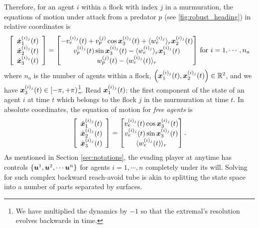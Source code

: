 Therefore, for an agent $i$ within a flock with index $j$ in a murmuration, the equations of motion under attack from a predator $p$ (see \autoref{fig:robust_heading}) in relative coordinates is %
%
\begin{align}
\left[\begin{array}{c}
\dot{\state}_1^{(i)_j}(t) \\ \dot{\state}_2^{(i)_j} (t) \\ \dot{\state}_3^{(i)_j} (t)
\end{array}\right] = \begin{bmatrix}
-v_e^{(i)_j}(t) + v_p^{(j)} \cos \state_3^{(i)_j}(t) + \langle w_e^{(i)_j} \rangle_r \state_2^{(i)_j}(t)
%
\\
v_p^{(i)_j}(t)\sin \state_3^{(i)_j}(t) - \langle w_e^{(i)_j} \rangle_r \state_1^{(i)_j}(t)
\\ 
w_p^{(j)}(t) - \langle w_e^{(i)_j}(t) \rangle_r
\end{bmatrix} \, \text{for } i=1,\cdots, n_a
\label{eq:DubinsRelative}
\end{align}
%
where $n_a$ is the number of agents within a flock, $\left(\bm{x}_1^{(i)_j}(t), {\bm{x}}_2^{(i)_j} (t)\right) \in \mathbb{R}^2$, and  we have $\bm{x}_3^{(i)_j} (t) \in \left[-\pi, +\pi\right)$\footnote{We have multiplied the dynamics by $-1$ so that the extremal's resolution evolves backwards in time.}. Read ${\bm{x}}_1^{(i)_j}(t)$: the first component of the state of an agent $i$ at time $t$ which belongs to the flock $j$ in the murmuration at time $t$. In absolute coordinates, the equation of motion for \textit{free agents} is 
%
\begin{align}\left[\begin{array}{c}
		\dot{\bm{x}}_1^{(i)_j}(t) \\ \dot{\bm{x}}_2^{(i)_j} (t) \\ \dot{\bm{x}}_3^{(i)_j} (t)
	\end{array}\right] = \begin{bmatrix}
		v_e^{(i)_j}(t) \cos \bm{x}_3^{(i)_j}(t) 
		\\
		v_e^{(i)_j}(t)\sin \bm{x}_3^{(i)_j}(t) 
		\\ 
		\langle w_e^{(i)_j}(t) \rangle_r
	\end{bmatrix}.
\end{align}
%
As mentioned in Section \ref{sec:notations}, the evading player at anytime has controls $\{\bm{u}^1, \bm{u}^2, \cdots \bm{u}^n\}$ for agents $i=1, \cdots, n$ completely  under its will. Solving for such complex backward reach-avoid tube is akin to splitting the state space into a number of parts separated by surfaces.  


